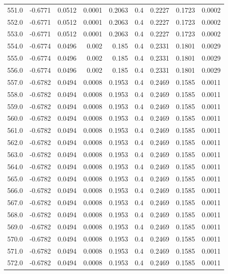 \begin{longtable}{lrrrrrrrr}
551.0 & -0.6771 & 0.0512 & 0.0001 & 0.2063 & 0.4 & 0.2227 & 0.1723 & 0.0002 \\
552.0 & -0.6771 & 0.0512 & 0.0001 & 0.2063 & 0.4 & 0.2227 & 0.1723 & 0.0002 \\
553.0 & -0.6771 & 0.0512 & 0.0001 & 0.2063 & 0.4 & 0.2227 & 0.1723 & 0.0002 \\
554.0 & -0.6774 & 0.0496 & 0.002 & 0.185 & 0.4 & 0.2331 & 0.1801 & 0.0029 \\
555.0 & -0.6774 & 0.0496 & 0.002 & 0.185 & 0.4 & 0.2331 & 0.1801 & 0.0029 \\
556.0 & -0.6774 & 0.0496 & 0.002 & 0.185 & 0.4 & 0.2331 & 0.1801 & 0.0029 \\
557.0 & -0.6782 & 0.0494 & 0.0008 & 0.1953 & 0.4 & 0.2469 & 0.1585 & 0.0011 \\
558.0 & -0.6782 & 0.0494 & 0.0008 & 0.1953 & 0.4 & 0.2469 & 0.1585 & 0.0011 \\
559.0 & -0.6782 & 0.0494 & 0.0008 & 0.1953 & 0.4 & 0.2469 & 0.1585 & 0.0011 \\
560.0 & -0.6782 & 0.0494 & 0.0008 & 0.1953 & 0.4 & 0.2469 & 0.1585 & 0.0011 \\
561.0 & -0.6782 & 0.0494 & 0.0008 & 0.1953 & 0.4 & 0.2469 & 0.1585 & 0.0011 \\
562.0 & -0.6782 & 0.0494 & 0.0008 & 0.1953 & 0.4 & 0.2469 & 0.1585 & 0.0011 \\
563.0 & -0.6782 & 0.0494 & 0.0008 & 0.1953 & 0.4 & 0.2469 & 0.1585 & 0.0011 \\
564.0 & -0.6782 & 0.0494 & 0.0008 & 0.1953 & 0.4 & 0.2469 & 0.1585 & 0.0011 \\
565.0 & -0.6782 & 0.0494 & 0.0008 & 0.1953 & 0.4 & 0.2469 & 0.1585 & 0.0011 \\
566.0 & -0.6782 & 0.0494 & 0.0008 & 0.1953 & 0.4 & 0.2469 & 0.1585 & 0.0011 \\
567.0 & -0.6782 & 0.0494 & 0.0008 & 0.1953 & 0.4 & 0.2469 & 0.1585 & 0.0011 \\
568.0 & -0.6782 & 0.0494 & 0.0008 & 0.1953 & 0.4 & 0.2469 & 0.1585 & 0.0011 \\
569.0 & -0.6782 & 0.0494 & 0.0008 & 0.1953 & 0.4 & 0.2469 & 0.1585 & 0.0011 \\
570.0 & -0.6782 & 0.0494 & 0.0008 & 0.1953 & 0.4 & 0.2469 & 0.1585 & 0.0011 \\
571.0 & -0.6782 & 0.0494 & 0.0008 & 0.1953 & 0.4 & 0.2469 & 0.1585 & 0.0011 \\
572.0 & -0.6782 & 0.0494 & 0.0008 & 0.1953 & 0.4 & 0.2469 & 0.1585 & 0.0011 \\

\end{longtable}
